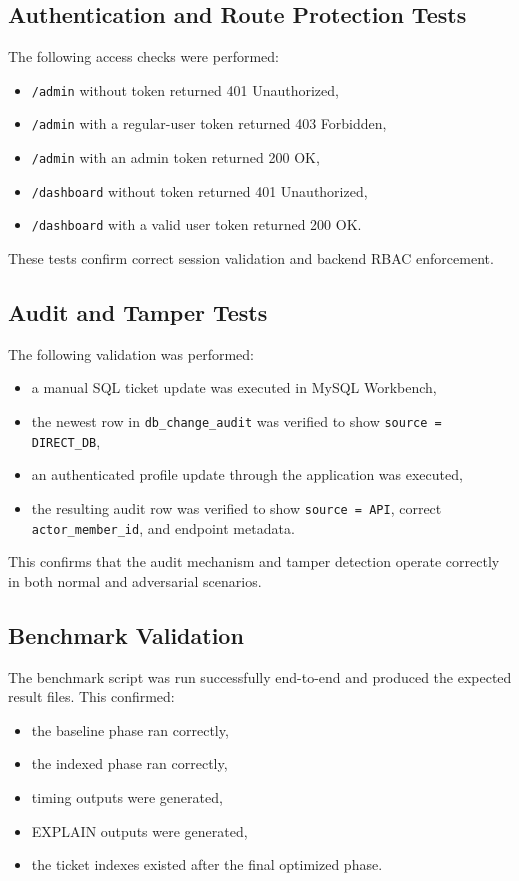 \documentclass[12pt,a4paper]{article}
\begin{document}
\subsection{Authentication and Route Protection Tests}
The following access checks were performed:
\begin{itemize}[leftmargin=1.5em]
    \item \texttt{/admin} without token returned 401 Unauthorized,
    \item \texttt{/admin} with a regular-user token returned 403 Forbidden,
    \item \texttt{/admin} with an admin token returned 200 OK,
    \item \texttt{/dashboard} without token returned 401 Unauthorized,
    \item \texttt{/dashboard} with a valid user token returned 200 OK.
\end{itemize}

These tests confirm correct session validation and backend RBAC enforcement.

\subsection{Audit and Tamper Tests}
The following validation was performed:
\begin{itemize}[leftmargin=1.5em]
    \item a manual SQL ticket update was executed in MySQL Workbench,
    \item the newest row in \texttt{db\_change\_audit} was verified to show \texttt{source = DIRECT\_DB},
    \item an authenticated profile update through the application was executed,
    \item the resulting audit row was verified to show \texttt{source = API}, correct \texttt{actor\_member\_id}, and endpoint metadata.
\end{itemize}

This confirms that the audit mechanism and tamper detection operate correctly in both normal and adversarial scenarios.

\subsection{Benchmark Validation}
The benchmark script was run successfully end-to-end and produced the expected result files. This confirmed:
\begin{itemize}[leftmargin=1.5em]
    \item the baseline phase ran correctly,
    \item the indexed phase ran correctly,
    \item timing outputs were generated,
    \item EXPLAIN outputs were generated,
    \item the ticket indexes existed after the final optimized phase.
\end{itemize}
\end{document}
